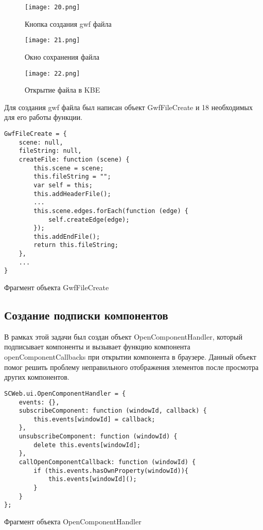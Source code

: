 \begin{figure}[H]
  \centering
  \texttt{[image: 20.png]}
  \caption{Кнопка создания gwf файла}
  \label{fig:hardware:sdr_pipeline}
\end{figure}

\begin{figure}[H]
  \centering
  \texttt{[image: 21.png]}
  \caption{Окно сохранения файла}
  \label{fig:hardware:sdr_pipeline}
\end{figure}

\begin{figure}[H]
  \centering
  \texttt{[image: 22.png]}
  \caption{Открытие файла в KBE}
  \label{fig:hardware:sdr_pipeline}
\end{figure}

Для создания gwf файла был написан объект GwfFileCreate и 18 необходимых для его работы функции.

\begin{listing}[H]
  \begin{verbatim}
GwfFileCreate = {
    scene: null,
    fileString: null,
    createFile: function (scene) {
        this.scene = scene;
        this.fileString = "";
        var self = this;
        this.addHeaderFile();
        ...
        this.scene.edges.forEach(function (edge) {
            self.createEdge(edge);
        });
        this.addEndFile();
        return this.fileString;
    },
    ...
}
  \end{verbatim}
  \caption{Фрагмент объекта GwfFileCreate}
  \label{lst:practice:modelling_example}
\end{listing}

\newpage
\subsection{Создание подписки компонентов}

В рамках этой задачи был создан объект OpenComponentHandler, который подписывает компоненты и вызывает функцию компонента openComponentCallbacks при открытии компонента в браузере. Данный объект помог решить проблему неправильного отображения элементов после просмотра других компонентов.

\begin{listing}[H]
  \begin{verbatim}
SCWeb.ui.OpenComponentHandler = {
    events: {},
    subscribeComponent: function (windowId, callback) {
        this.events[windowId] = callback;
    },
    unsubscribeComponent: function (windowId) {
        delete this.events[windowId];
    },
    callOpenComponentCallback: function (windowId) {
        if (this.events.hasOwnProperty(windowId)){
            this.events[windowId]();
        }
    }
};
  \end{verbatim}
  \caption{Фрагмент объекта OpenComponentHandler}
  \label{lst:practice:modelling_example}
\end{listing}


